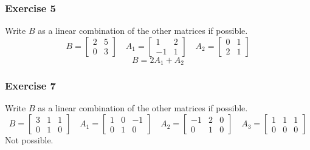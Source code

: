 \documentclass{math}
\begin{document}
\subsubsection*{Exercise 5}
Write \( B \) as a linear combination of the other matrices if possible.
\[ B = \begin{bmatrix}2 & 5 \\ 0 & 3\end{bmatrix} \quad
  A_1 = \begin{bmatrix}1 & 2 \\ -1 & 1\end{bmatrix} \quad
  A_2 = \begin{bmatrix}0 & 1 \\ 2 & 1\end{bmatrix} \]
\[ B = 2A_1+A_2 \]

\subsubsection*{Exercise 7}
Write \( B \) as a linear combination of the other matrices if possible.
\[ B = \begin{bmatrix}3 & 1 & 1 \\ 0 & 1 & 0\end{bmatrix} \quad
  A_1 = \begin{bmatrix}1 & 0 & -1 \\ 0 & 1 & 0\end{bmatrix} \quad
  A_2 = \begin{bmatrix}-1 & 2 & 0 \\ 0 & 1 & 0\end{bmatrix} \quad
  A_3 = \begin{bmatrix}1 & 1 & 1 \\ 0 & 0 & 0\end{bmatrix} \]
Not possible.
\end{document}
